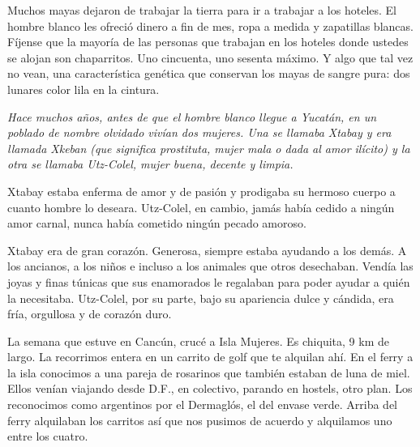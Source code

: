 \documentclass[12pt,twoside,openright,a5paper]{book}
\begin{document}
\vspace{0.5cm}

\hrulefill\hspace{0.2cm} \decofourleft\decofourright \hspace{0.2cm} \hrulefill
\vspace{0.5cm}

Muchos mayas dejaron de trabajar la tierra para ir a trabajar a los
hoteles.  El hombre blanco les ofreció dinero a fin de mes, ropa a medida y
zapatillas blancas.  Fíjense que la mayoría de las personas que trabajan
en los hoteles donde ustedes se alojan son chaparritos. Uno cincuenta, uno
sesenta máximo. Y algo que tal vez no vean, una característica genética
que conservan los mayas de sangre pura: dos lunares color lila en la cintura.

\vspace{0.5cm}

\hrulefill\hspace{0.2cm} \decofourleft\decofourright \hspace{0.2cm} \hrulefill
\vspace{0.5cm}

{\em Hace muchos años, antes de que el hombre blanco llegue a Yucatán,
en un poblado de nombre olvidado vivían dos mujeres. Una se llamaba Xtabay
y era llamada Xkeban (que significa prostituta, mujer mala o dada al amor
ilícito) y la otra se llamaba Utz-Colel, mujer buena, decente y limpia.

Xtabay estaba enferma de amor y de pasión y prodigaba su hermoso cuerpo
a cuanto hombre lo deseara. Utz-Colel, en cambio, jamás había cedido a
ningún amor carnal, nunca había cometido ningún pecado amoroso.

Xtabay era de gran corazón. Generosa, siempre estaba ayudando a los
demás. A los ancianos, a los niños e incluso a los animales que otros
desechaban. Vendía las joyas y finas túnicas que sus enamorados le regalaban
para poder ayudar a quién la necesitaba. Utz-Colel, por su parte, bajo su
apariencia dulce y cándida, era fría, orgullosa y de corazón duro.}

\vspace{0.5cm}
\afterpage{}
\hrulefill\hspace{0.2cm} \decofourleft\decofourright \hspace{0.2cm} \hrulefill
\vspace{0.5cm}

La semana que estuve en Cancún, crucé a Isla Mujeres. Es chiquita, 9 km de
largo. La recorrimos entera en un carrito de golf que te alquilan ahí. En
el ferry a la isla conocimos a una pareja de rosarinos que también estaban
de luna de miel. Ellos venían viajando desde D.F., en colectivo, parando
en hostels, otro plan. Los reconocimos como argentinos por el Dermaglós,
el del envase verde. Arriba del ferry alquilaban los carritos así que nos
pusimos de acuerdo y alquilamos uno entre los cuatro.
\end{document}
